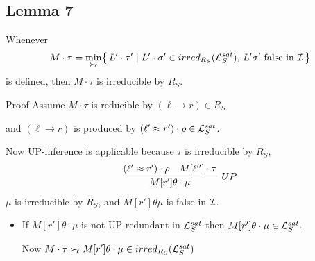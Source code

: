 \documentclass[%
handout,
]{beamer}
\begin{document}
\subsection{Lemma 7}
\begin{frame}[allowframebreaks]
    \begin{lemma}\label{irreducible}
        Whenever
        \begin{gather*}
            M\cdot\tau = \min_{\mathrel\succ_{\!\ell}}\!
            \left\{\,
            L'\cdot\tau' \mid
            L'\cdot\sigma' \in irred_{R_S}(\mathcal{L}_S^{sat}),\,
            L'\sigma'\text{ false in }\mathcal{I}\,
            \right\}
        \end{gather*}
        is defined, then $M\cdot\tau$ is irreducible by $R_S$.
    \end{lemma}

    \begin{block}{Proof}
        Assume $M\cdot\tau$ is reducible by $(\ell\to r)\in R_S$

        and $(\ell\to r)$ is produced by $(\ell'\approx r')\cdot\rho\in\mathcal{L}_S^{sat}$.

        \vspace{0.7em}
        Now UP-inference is applicable because $\tau$ is irreducible by $R_S$,
        \begin{gather*}
            \infer[UP]
            {M[r']\theta\cdot\mu}
            {(\ell'\mEQ r')\cdot\rho & M[\ell'']\cdot\tau}
        \end{gather*}
        $\mu$ is irreducible by $R_S$, and $M[r']\theta\mu${ is false in }$\mathcal{I}$.
    \end{block}

    \framebreak



        \begin{itemize}
            \item If $M[r']\theta\cdot\mu$ is not UP-redundant in $\mathcal{L}_S^{sat}$
            then $M[r']\theta\cdot\mu\in\mathcal{L}_S^{sat}$.

            \vspace{0.7em}
            Now $M\cdot\tau\mathrel\succ_{\!\ell}
            M[r']\theta\cdot\mu\in irred_{R_S}(\mathcal{L}_S^{sat})$


\end{itemize}
\end{frame}
\end{document}
